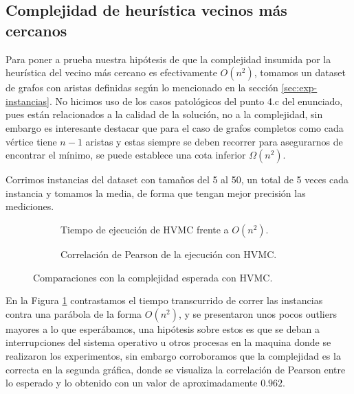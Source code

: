 \documentclass[10pt,a4paper]{article}
\begin{document}
\subsection{Complejidad de heurística vecinos más cercanos}
Para poner a prueba nuestra hipótesis de que la complejidad insumida por la heurística del vecino más cercano es efectivamente $O(n^2)$, tomamos un dataset de grafos con aristas definidas según lo mencionado en la sección \ref{sec:exp-instancias}. No hicimos uso de los casos patológicos del punto 4.c del enunciado, pues están relacionados a la calidad de la solución, no a la complejidad, sin embargo es interesante destacar que para el caso de grafos completos como cada vértice tiene $n-1$ aristas y estas siempre se deben recorrer para asegurarnos de encontrar el mínimo, se puede establece una cota inferior $\Omega(n^2)$. 

Corrimos instancias del dataset con tamaños del 5 al 50, un total de 5 veces cada instancia y tomamos la media, de forma que tengan mejor precisión las mediciones.

\begin{figure}[h!]
    \centering
    \captionsetup{justification=centering}
    \begin{subfigure}{0.45\linewidth}
        
        \centering
        \caption{Tiempo de ejecución de HVMC frente a $O(n^2)$.}
        \label{fig:exp_hvmc_1}
    \end{subfigure}
    \begin{subfigure}{0.45\linewidth}
        \centering
        
        \caption{Correlación de Pearson de la ejecución con HVMC.}
        \label{fig:exp_hvmc_2}
    \end{subfigure}
    \caption{Comparaciones con la complejidad esperada con HVMC.}
\end{figure}

En la Figura \ref{fig:exp_hvmc_1} contrastamos el tiempo transcurrido de correr las instancias contra una parábola de la forma $O(n^2)$, y se presentaron unos pocos outliers mayores a lo que esperábamos, una hipótesis sobre estos es que se deban a interrupciones del sistema operativo u otros procesas en la maquina donde se realizaron los experimentos, sin embargo corroboramos que la complejidad es la correcta en la segunda gráfica, donde se visualiza la correlación de Pearson entre lo esperado y lo obtenido con un valor de aproximadamente $0.962$.
\end{document}
